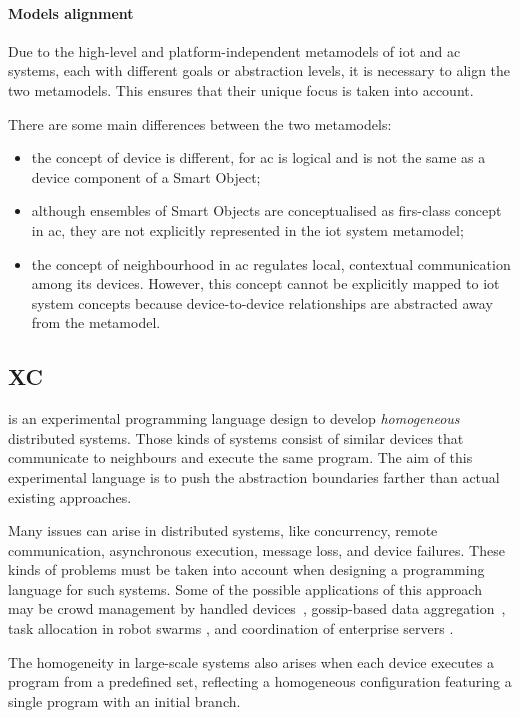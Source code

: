 \paragraph{Models alignment}
Due to the high-level and platform-independent metamodels of \ac{iot} and \ac{ac} systems, each with different goals or
abstraction levels, it is necessary to align the two metamodels.
This ensures that their unique focus is taken into account.

There are some main differences between the two metamodels:
\begin{itemize}
    \item the concept of device is different, for \ac{ac} is logical and is not the same as a device component of a Smart Object;
    \item although ensembles of Smart Objects are conceptualised as firs-class concept in \ac{ac}, they are not explicitly
        represented in the \ac{iot} system metamodel;
    \item the concept of neighbourhood in \ac{ac} regulates local, contextual communication among its devices.
        However, this concept cannot be explicitly mapped to \ac{iot} system concepts because device-to-device relationships
        are abstracted away from the metamodel.
\end{itemize}

\subsection{XC}
\label{subsec:xc}
\xc{} is an experimental programming language design to develop \emph{homogeneous} distributed systems.
Those kinds of systems consist of similar devices that communicate to neighbours and execute the same program.
The aim of this experimental language is to push the abstraction boundaries farther than actual existing approaches.

Many issues can arise in distributed systems, like concurrency, remote communication, asynchronous execution, message
loss, and device failures.
These kinds of problems must be taken into account when designing a programming language for such systems.
Some of the possible applications of this approach may be crowd management by handled devices~\cite{7274429},
gossip-based data aggregation~\cite{10.1145/1082469.1082470}, task allocation in robot swarms \cite{swarms1,1420661},
and coordination of enterprise servers \cite{7306601}.

The homogeneity in large-scale systems also arises when each device executes a program from a predefined set, reflecting
a homogeneous configuration featuring a single program with an initial branch.


